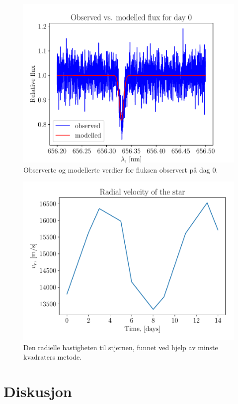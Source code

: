 \documentclass[reprint, english,notitlepage]{revtex4-1}  %
\begin{document}
\begin{figure}
  \includegraphics[width=\linewidth]{../output/plots/modelled_flux.pdf}
  \caption{Observerte og modellerte verdier for fluksen observert på dag 0.}
  \label{fig:modelled_flux}
\end{figure}

\begin{figure}
  \includegraphics[width=\linewidth]{../output/plots/radial_vels.pdf}
  \caption{Den radielle hastigheten til stjernen, funnet ved hjelp av minste kvadraters metode.}
  \label{fig:radial_vels}
\end{figure}


\section{Diskusjon}
\end{document}
